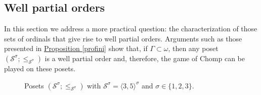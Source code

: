 \documentclass[reqno]{amsart}
\theoremstyle{definition}
\theoremstyle{definition}
\theoremstyle{plain} %
\begin{document}
\subsection{Well partial orders} In this section we address a more practical question: the characterization of those sets of ordinals that give rise to well partial orders. Arguments such as those presented in \hyperref[profini]{Proposition \ref{profini}} show that, if $\Gamma \subset \omega$, then any poset $(\mathcal{S}^\sigma; \leq_{\mathcal{S}^\sigma})$ is a well partial order and, therefore, the game of Chomp can be played on these posets.
\begin{figure}[h!]
\def\svgwidth{0.87\columnwidth}    \caption{Posets $(\mathcal{S}^\sigma;\leq_{\mathcal{S^\sigma}})$ with $\mathcal{S}^\sigma=\langle3,5\rangle^\sigma$ and $\sigma\in\{1,2,3\}$.}\label{fig1}
\end{figure}
\end{document}

